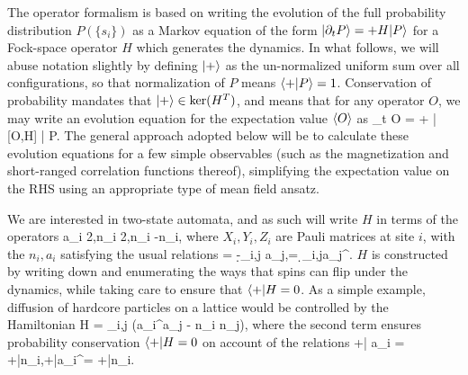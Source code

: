 \documentclass[pra,aps,twocolumn,groupedaddress,superscriptaddress,nofootinbib,preprintnumbers]{revtex4-2}
\begin{document}
\begin{widetext}
		The operator formalism is based on writing the evolution of the full probability distribution $P(\{ s_i\})$ as a Markov equation of the form $|\partial_t P\rangle = +H |P\rangle$ for a Fock-space operator $H$ which generates the dynamics. In what follows, we will abuse notation slightly by defining $|+\rangle$ as the un-normalized uniform sum over all configurations, so that normalization of $P$ means $\langle +|P\rangle =1$. Conservation of probability mandates that $|+\rangle \in {\rm ker}(H^T)$, and means that for any operator $O$, we may write an evolution equation for the expectation value $\langle O\rangle$ as 
		\be \p_t \lan O \ran = \lan + | [O,H] | P\ran.\ee 
		The general approach adopted below will be to calculate these evolution equations for a few simple observables (such as the magnetization and short-ranged correlation functions thereof), simplifying the expectation value on the RHS using an appropriate type of mean field ansatz. 
		
		We are interested in two-state automata, and as such will write $H$ in terms of the operators 
		\be a_i \equiv {}2,\qq n_i \equiv {}2,\qq \ob n_i -n_i,\ee
		where $X_i,Y_i,Z_i$ are Pauli matrices at site $i$, with the $n_i,a_i$ satisfying the usual relations
		\be [n_i,a_j] = -\d_{i,j} a_j,\qq  [n_i,a_j^\da] = \d_{i,j}a_j^\da.\ee  
		$H$ is constructed by writing down and enumerating the ways that spins can flip under the dynamics, while taking care to ensure that $\langle +|H = 0$. As a simple example, diffusion of hardcore particles on a lattice would be controlled by the Hamiltonian 
		\be H = \sum_{\lan i,j \ran } (a_i^\da a_j - \ob n_i n_j),\ee 
		where the second term ensures probability conservation $\langle + | H = 0$ on account of the relations 
		\be \lan +| a_i = \lan +|n_i,\qq \lan +|a_i^\da = \lan +|\ob n_i.\ee 
		

\end{widetext}
\end{document}
